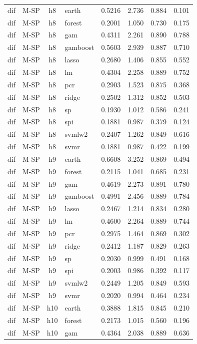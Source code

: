 \begin{ThreePartTable}
\begin{longtable}[t]{llclcccc}
dif & M-SP & h8 & earth & 0.5216 & 2.736 & 0.884 & 0.101\\
dif & M-SP & h8 & forest & 0.2001 & 1.050 & 0.730 & 0.175\\
dif & M-SP & h8 & gam & 0.4311 & 2.261 & 0.890 & 0.788\\
dif & M-SP & h8 & gamboost & 0.5603 & 2.939 & 0.887 & 0.710\\
dif & M-SP & h8 & lasso & 0.2680 & 1.406 & 0.855 & 0.552\\
dif & M-SP & h8 & lm & 0.4304 & 2.258 & 0.889 & 0.752\\
dif & M-SP & h8 & pcr & 0.2903 & 1.523 & 0.875 & 0.368\\
dif & M-SP & h8 & ridge & 0.2502 & 1.312 & 0.852 & 0.503\\
dif & M-SP & h8 & sp & 0.1930 & 1.012 & 0.586 & 0.241\\
dif & M-SP & h8 & spi & 0.1881 & 0.987 & 0.379 & 0.124\\
dif & M-SP & h8 & svmlw2 & 0.2407 & 1.262 & 0.849 & 0.616\\
dif & M-SP & h8 & svmr & 0.1881 & 0.987 & 0.422 & 0.199\\
\addlinespace
dif & M-SP & h9 & earth & 0.6608 & 3.252 & 0.869 & 0.494\\
dif & M-SP & h9 & forest & 0.2115 & 1.041 & 0.685 & 0.231\\
dif & M-SP & h9 & gam & 0.4619 & 2.273 & 0.891 & 0.780\\
dif & M-SP & h9 & gamboost & 0.4991 & 2.456 & 0.889 & 0.784\\
dif & M-SP & h9 & lasso & 0.2467 & 1.214 & 0.834 & 0.280\\
dif & M-SP & h9 & lm & 0.4600 & 2.264 & 0.889 & 0.744\\
dif & M-SP & h9 & pcr & 0.2975 & 1.464 & 0.869 & 0.302\\
dif & M-SP & h9 & ridge & 0.2412 & 1.187 & 0.829 & 0.263\\
dif & M-SP & h9 & sp & 0.2030 & 0.999 & 0.491 & 0.168\\
dif & M-SP & h9 & spi & 0.2003 & 0.986 & 0.392 & 0.117\\
dif & M-SP & h9 & svmlw2 & 0.2449 & 1.205 & 0.849 & 0.593\\
dif & M-SP & h9 & svmr & 0.2020 & 0.994 & 0.464 & 0.234\\
\addlinespace
dif & M-SP & h10 & earth & 0.3888 & 1.815 & 0.845 & 0.210\\
dif & M-SP & h10 & forest & 0.2173 & 1.015 & 0.560 & 0.196\\
dif & M-SP & h10 & gam & 0.4364 & 2.038 & 0.889 & 0.636\\

\end{longtable}
\end{ThreePartTable}
